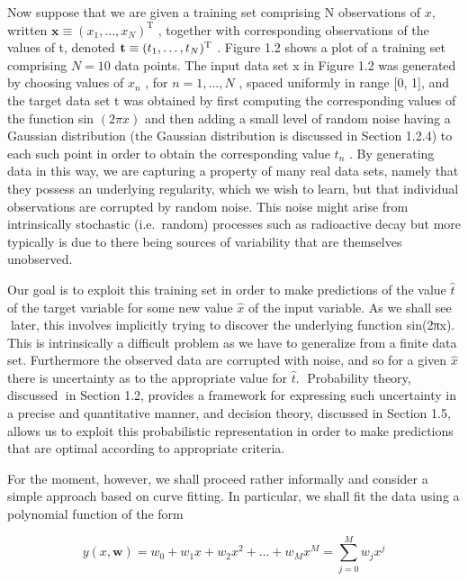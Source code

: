 \documentclass[
  10
]{article}
\begin{document}
Now suppose that we are given a training set comprising N observations
of \(x ,\) written
\(\mathbf { x } \equiv ( x _ { 1 } , \ldots , x _ { N } ) ^ { \mathrm { T } }\)
, together with corresponding observations of the values of t, denoted
\({ \bf t } \equiv ( t _ { 1 } , \ldots , t _ { N } ) ^ { \mathrm { T } }\)
. Figure 1.2 shows a plot of a training set comprising \(N = 1 0\) data
points. The input data set x in Figure 1.2 was generated by choosing
values of \(x _ { n }\) , for \(n = 1 , \ldots , N\) , spaced uniformly
in range {[}0, 1{]}, and the target data set t was obtained by first
computing the corresponding values of the function sin \(( 2 \pi x )\)
and then adding a small level of random noise having a Gaussian
distribution (the Gaussian distribution is discussed in Section 1.2.4)
to each such point in order to obtain the corresponding value
\(t _ { n }\) . By generating data in this way, we are capturing a
property of many real data sets, namely that they possess an underlying
regularity, which we wish to learn, but that individual observations are
corrupted by random noise. This noise might arise from intrinsically
stochastic (i.e.~random) processes such as radioactive decay but more
typically is due to there being sources of variability that are
themselves unobserved.

Our goal is to exploit this training set in order to make predictions of
the value \(\widehat { t }\) of the target variable for some new value
\(\widehat { x }\) of the input variable. As we shall see later, this
involves implicitly trying to discover the underlying function sin(2πx).
This is intrinsically a difficult problem as we have to generalize from
a finite data set. Furthermore the observed data are corrupted with
noise, and so for a given \(\widehat { x }\) there is uncertainty as to
the appropriate value for \(\widehat { t } .\)  Probability theory,
discussed in Section 1.2, provides a framework for expressing such
uncertainty in a precise and quantitative manner, and decision theory,
discussed in Section 1.5, allows us to exploit this probabilistic
representation in order to make predictions that are optimal according
to appropriate criteria.

For the moment, however, we shall proceed rather informally and consider
a simple approach based on curve fitting. In particular, we shall fit
the data using a polynomial function of the form

\[
y (x, \mathbf {w}) = w _ {0} + w _ {1} x + w _ {2} x ^ {2} + \dots + w _ {M} x ^ {M} = \sum_ {j = 0} ^ {M} w _ {j} x ^ {j}\tag{1.1}
\]
\end{document}
